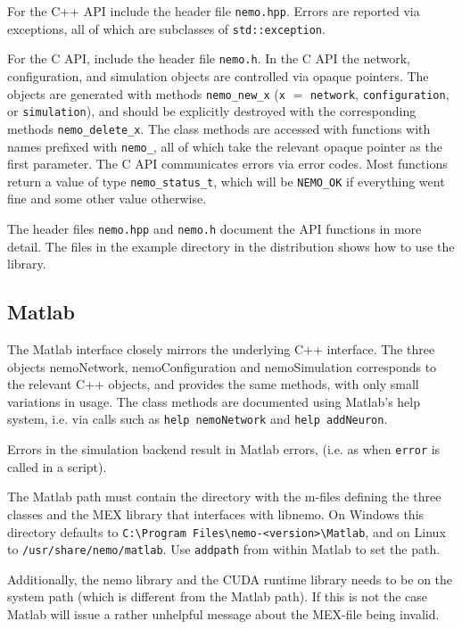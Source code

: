 \documentclass[a4paper]{article}
\newcommand{\code}[1]{\texttt{#1}}
\newcommand{\file}[1]{\texttt{#1}}
\begin{document}
For the C++ API include the header file \file{nemo.hpp}.
Errors are reported via exceptions, all of which are subclasses of \code{std::exception}.

For the C API, include the header file \file{nemo.h}. 
In the C API the network, configuration, and simulation objects are controlled
via opaque pointers.
The objects are generated with methods 
\code{nemo\_new\_x} (\code{x} $=$ \code{network}, \code{configuration}, or \code{simulation}),
and should be explicitly destroyed with the corresponding methods 
\code{nemo\_delete\_x}.
The class methods are accessed with functions with names prefixed with \code{nemo\_},
	all of which take the relevant opaque pointer as the first parameter.
The C API communicates errors via error codes.
Most functions return a value of type \code{nemo\_status\_t},
	which will be \code{NEMO\_OK} if everything went fine and some other value otherwise.

The header files \file{nemo.hpp} and \file{nemo.h} document the API functions in more detail.
The files in the example directory in the distribution shows how to use the library.

\subsection{Matlab}

The Matlab interface closely mirrors the underlying C++ interface.
The three objects nemoNetwork, nemoConfiguration and nemoSimulation corresponds
to the relevant C++ objects,
	and provides the same methods,
	with only small variations in usage.
The class methods are documented using Matlab's help system,
	i.e. via calls such as \code{help nemoNetwork} and \code{help addNeuron}.

Errors in the simulation backend result in Matlab errors,
	(i.e. as when \code{error} is called in a script).

The Matlab path must contain the directory with the m-files defining the three classes and the MEX
library that interfaces with libnemo.
On Windows this directory defaults to \file{C:\textbackslash Program Files\textbackslash nemo-<version>\textbackslash Matlab},
and on Linux to \file{/usr/share/nemo/matlab}.
Use \code{addpath} from within Matlab to set the path.

Additionally, the nemo library and the CUDA runtime library needs to be on the
system path (which is different from the Matlab path).
If this is not the case Matlab will issue a rather unhelpful message about the MEX-file being invalid.
\end{document}
